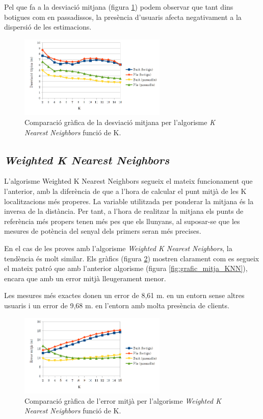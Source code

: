 Pel que fa a la desviació mitjana (figura \ref{fig:grafic_desviacio_KNN}) podem observar que tant dins botigues com en passadissos, la presència d'usuaris afecta negativament a la dispersió de les estimacions.

\begin{figure}[ht]
\begin{center}
\includegraphics[width=7cm]{imatges/knn_desviacio.png}
\caption{Comparació gràfica de la desviació mitjana per l'algorisme \textit{K Nearest Neighbors} funció de K.}
\label{fig:grafic_desviacio_KNN}
\end{center}
\end{figure}

\subsection{\textit{Weighted K Nearest Neighbors}}

L'algorisme Weighted K Nearest Neighbors segueix el mateix funcionament que l'anterior, amb la diferència de que a l'hora de calcular el punt mitjà de les K localitzacions més properes. La variable utilitzada per ponderar la mitjana és la inversa de la distància. Per tant, a l'hora de realitzar la mitjana els punts de referència més propers tenen més pes que els llunyans, al suposar-se que les mesures de potència del senyal dels primers seran més precises.

En el cas de les proves amb l'algorisme \textit{Weighted K Nearest Neighbors}, la tendència és molt similar. Els gràfics (figura \ref{fig:grafic_mitja_WKNN}) mostren clarament com es segueix el mateix patró que amb l'anterior algorisme (figura \ref{fig:grafic_mitja_KNN}), encara que amb un error mitjà lleugerament menor.

Les mesures més exactes donen un error de 8,61 m. en un entorn sense altres usuaris i un error de 9,68 m. en l'entorn amb molta presència de clients.

\begin{figure}[ht]
\begin{center}
\includegraphics[width=7cm]{imatges/wknn_mitja.png}
\caption{Comparació gràfica de l'error mitjà per l'algorisme \textit{Weighted K Nearest Neighbors} funció de K.}
\label{fig:grafic_mitja_WKNN}
\end{center}
\end{figure}

